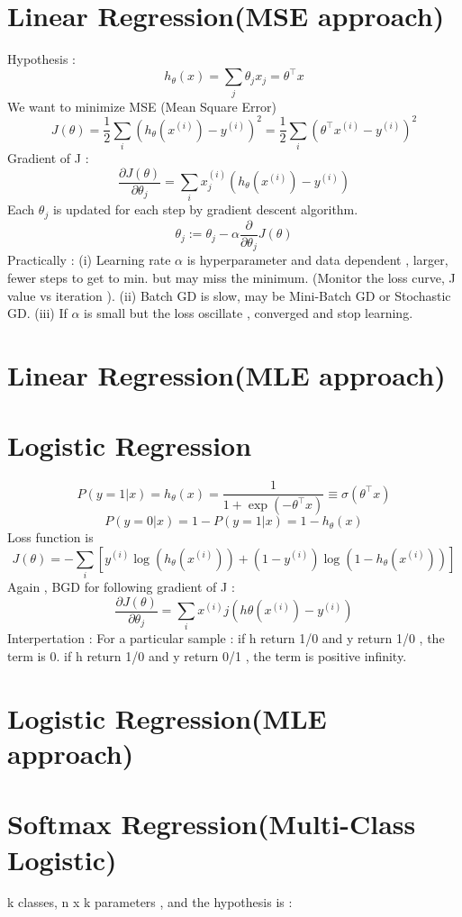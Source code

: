 \documentclass{article}
\begin{document}
\section{Linear Regression(MSE approach) }
Hypothesis : 
\[
h_\theta(x) = \sum_j \theta_j x_j = \theta^\top x
\]
We want to minimize MSE (Mean Square Error) 
\[
J(\theta) = \frac{1}{2} \sum_i \left( h_\theta(x^{(i)}) - y^{(i)} \right)^2 = \frac{1}{2} \sum_i \left( \theta^\top x^{(i)} - y^{(i)} \right)^2
\]
Gradient of J : 
\[
\frac{\partial J(\theta)}{\partial \theta_j} = \sum_i x_j^{(i)} \left( h_\theta(x^{(i)}) - y^{(i)} \right)
\]
Each \(\theta_j\) is updated for each step by gradient descent algorithm. 
\[
\theta_j := \theta_j - \alpha \frac{\partial}{\partial \theta_j} J(\theta)
\]
Practically : 
\newline
(i) Learning rate \(\alpha\) is hyperparameter and data dependent , larger, fewer steps to get to min. but may miss the minimum. (Monitor the loss curve, J value vs iteration ). 
\newline
(ii) Batch GD is slow, may be Mini-Batch GD or Stochastic GD.
\newline
(iii) If \(\alpha\) is small but the loss oscillate , converged and stop learning.


\section{Linear Regression(MLE approach) }
\section{Logistic Regression}
\[P(y=1|x) = h_\theta(x) = \frac{1}{1 + \exp(-\theta^\top x)} \equiv \sigma(\theta^\top x)\]
\[P(y=0|x) = 1 - P(y=1|x) = 1 - h_\theta(x)\]
Loss function is 
\[J(\theta) = -\sum_i \left[ y^{(i)} \log(h_\theta(x^{(i)})) + (1 - y^{(i)}) \log(1 - h_\theta(x^{(i)})) \right]\]
Again , BGD for following gradient of J : 
\[\frac{\partial J(\theta)}{\partial \theta_j} = \sum_i x^{(i)}j \left( h\theta(x^{(i)}) - y^{(i)} \right)\]
Interpertation : For a particular sample : if h return 1/0 and y return 1/0 , the term is 0. if  h return 1/0 and y return 0/1 , the term is positive infinity. 
\section{Logistic Regression(MLE approach)}
\section{Softmax Regression(Multi-Class Logistic)}
k classes, n x k parameters , and the hypothesis is :
\end{document}
